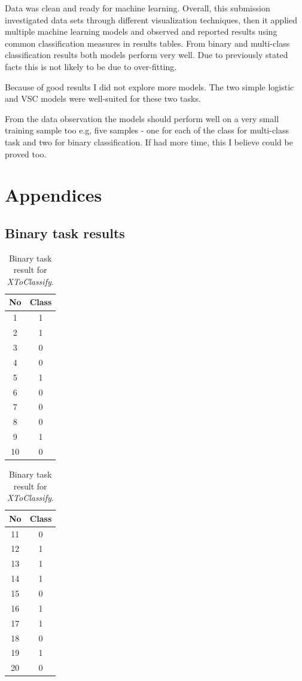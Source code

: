 \documentclass[11pt]{article}
\begin{document}
		Data was clean and ready for machine learning. Overall, this submission investigated data sets through different visualization techniques, then it applied multiple machine learning models and observed and reported results using common classification measures in results tables. From binary and multi-class classification results both models perform very well. Due to previously stated facts this is not likely to be due to over-fitting. 

		Because of good results I did not explore more models. The two simple logistic and VSC models were well-suited for these two tasks. 

		From the data observation the models should perform well on a very small training sample too e.g, five samples - one for each of the class for multi-class task and two for binary classification. If had more time, this I believe could be proved too. 
	\clearpage
	\appendix
	\section{Appendices}
		\subsection{Binary task results}
		\begin{center}
		  	\begin{table}[h]
		  		\small

		  	\centering

			\begin{tabular}[b]{| c | c|} 
				\hline
				No & Class \\
				\hline
				1 & 1 \\ 2 & 1 \\ 3 & 0 \\ 4 & 0 \\ 5 & 1 \\ 6 & 0 \\ 7 & 0 \\ 8 & 0 \\ 9 & 1 \\ 10 & 0 \\
				\hline
			\end{tabular}
			\begin{tabular}[b]{| c | c|} 
				\hline
				No & Class \\
				\hline
				11 & 0 \\ 12 & 1 \\ 13 & 1 \\ 14 & 1 \\ 15 & 0 \\ 16 & 1 \\ 17 & 1 \\ 18 & 0 \\ 19 & 1 \\ 20 & 0 \\
				\hline
			\end{tabular}
			\caption{Binary task result for \textit{XToClassify}.}
			\label{tbl:final_binary}
			\end{table}
		\end{center}
\end{document}

